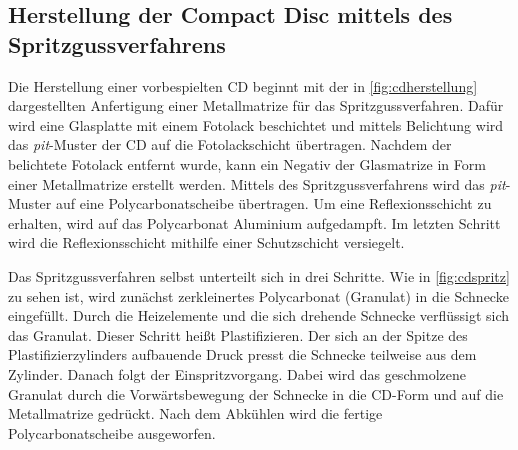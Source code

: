\subsection{Herstellung der Compact Disc mittels des Spritzgussverfahrens}
\label{subsec:cdherstellung}

Die Herstellung einer vorbespielten CD beginnt mit der in
\autoref{fig:cdherstellung} dargestellten Anfertigung einer Metallmatrize für
das Spritzgussverfahren. Dafür wird eine Glasplatte mit einem Fotolack
beschichtet und mittels Belichtung wird das \textit{pit}-Muster der CD auf die
Fotolackschicht übertragen. Nachdem der belichtete Fotolack entfernt wurde, kann
ein Negativ der Glasmatrize in Form einer Metallmatrize erstellt werden. Mittels
des Spritzgussverfahrens wird das \textit{pit}-Muster auf eine
Polycarbonatscheibe übertragen. Um eine Reflexionsschicht zu erhalten, wird auf
das Polycarbonat Aluminium aufgedampft. Im letzten Schritt wird die
Reflexionsschicht mithilfe einer Schutzschicht versiegelt. \cite{cdp}


Das Spritzgussverfahren selbst unterteilt sich in drei Schritte. Wie in
\autoref{fig:cdspritz} zu sehen ist, wird zunächst zerkleinertes Polycarbonat
(Granulat) in die Schnecke eingefüllt. Durch die Heizelemente und die sich
drehende Schnecke verflüssigt sich das Granulat. Dieser Schritt heißt
Plastifizieren. Der sich an der Spitze des Plastifizierzylinders aufbauende
Druck presst die Schnecke teilweise aus dem Zylinder. Danach folgt der
Einspritzvorgang. Dabei wird das geschmolzene Granulat durch die
Vorwärtsbewegung der Schnecke in die CD-Form und auf die Metallmatrize gedrückt.
Nach dem Abkühlen wird die fertige Polycarbonatscheibe ausgeworfen. \cite{cdpf}

